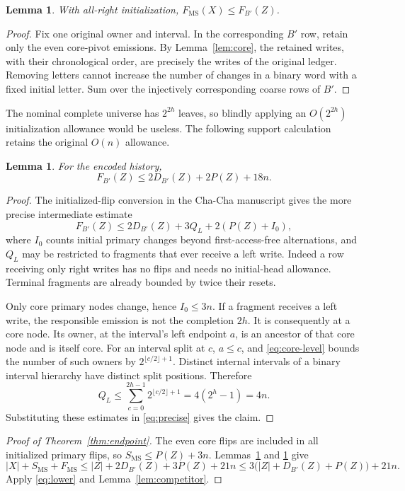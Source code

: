 \documentclass[11pt]{article}
\newtheorem{lemma}[theorem]{Lemma}
\newcommand{\MS}{\mathrm{MS}}
\begin{document}
\begin{lemma}\label{lem:subsequence}
With all-right initialization, $F_{\MS}(X)\le F_{B'}(Z)$.
\end{lemma}
\begin{proof}
Fix one original owner and interval. In the corresponding $B'$ row,
retain only the even core-pivot emissions. By Lemma~\ref{lem:core},
the retained writes, with their chronological order, are precisely the
writes of the original ledger. Removing letters cannot increase the
number of changes in a binary word with a fixed initial letter. Sum
over the injectively corresponding coarse rows of $B'$.
\end{proof}

The nominal complete universe has $2^{2h}$ leaves, so blindly applying
an $O(2^{2h})$ initialization allowance would be useless. The following
support calculation retains the original $O(n)$ allowance.

\begin{lemma}\label{lem:initial}
For the encoded history,
\[
 F_{B'}(Z)\le 2D_{B'}(Z)+2P(Z)+18n.
\]
\end{lemma}
\begin{proof}
The initialized-flip conversion in the Cha-Cha manuscript gives
the more precise intermediate estimate
\begin{equation}\label{eq:precise}
 F_{B'}(Z)\le 2D_{B'}(Z)+3Q_L+2(P(Z)+I_0),
\end{equation}
where $I_0$ counts initial primary changes beyond first-access-free
alternations, and $Q_L$ may be restricted to fragments that ever
receive a left write. Indeed a row receiving only right writes has no
flips and needs no initial-head allowance. Terminal fragments are
already bounded by twice their resets.

Only core primary nodes change, hence $I_0\le3n$. If a fragment
receives a left write, the responsible emission is not the completion
$2h$. It is consequently at a core node. Its owner, at the interval's
left endpoint $a$, is an ancestor of that core node and is itself core.
For an interval split at $c$, $a\le c$, and
\eqref{eq:core-level} bounds the number of such owners by
$2^{\lfloor c/2\rfloor+1}$. Distinct internal intervals of a binary
interval hierarchy have distinct split positions. Therefore
\[
 Q_L\le\sum_{c=0}^{2h-1}2^{\lfloor c/2\rfloor+1}
 =4(2^h-1)=4n.
\]
Substituting these estimates in \eqref{eq:precise} gives the claim.
\end{proof}

\begin{proof}[Proof of Theorem~\ref{thm:endpoint}]
The even core flips are included in all initialized primary flips, so
$S_{\MS}\le P(Z)+3n$. Lemmas~\ref{lem:subsequence} and
\ref{lem:initial} give
\[
 |X|+S_{\MS}+F_{\MS}
 \le |Z|+2D_{B'}(Z)+3P(Z)+21n
 \le3\bigl(|Z|+D_{B'}(Z)+P(Z)\bigr)+21n.
\]
Apply \eqref{eq:lower} and Lemma~\ref{lem:competitor}.
\end{proof}
\end{document}
